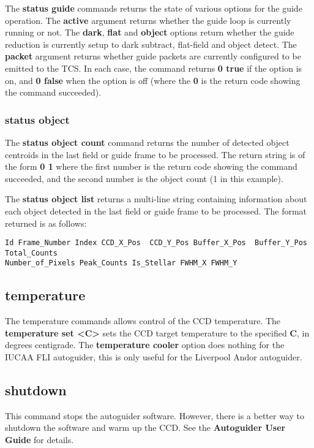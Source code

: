 \documentclass[10pt,a4paper]{article}
\begin{document}
The {\bf status guide} commands returns the state of various options for the guide operation. The {\bf active} argument returns whether the guide loop is currently running or not. The {\bf dark}, {\bf flat} and {\bf object} options return whether the guide reduction is currently setup to dark subtract, flat-field and object detect. The {\bf packet} argument returns whether guide packets are currently configured to be emitted to the TCS. In each case, the command returns {\bf 0 true} if the option is on, and {\bf 0 false} when the option is off (where the {\bf 0} is the return code showing the command succeeded).

\subsubsection{status object}

The {\bf status object count} command returns the number of detected object centroids in the last field or guide frame to be processed. The return string is of the form {\bf 0 1} where the first number is the return code showing the command succeeded, and the second number is the object count (1 in this example).

The {\bf status object list} returns a multi-line string containing information about each object detected in the last field or guide frame to be processed. The format returned is as follows:
\begin{verbatim}
Id Frame_Number Index CCD_X_Pos  CCD_Y_Pos Buffer_X_Pos  Buffer_Y_Pos  Total_Counts 
Number_of_Pixels Peak_Counts Is_Stellar FWHM_X FWHM_Y
\end{verbatim}

\subsection{temperature}

The temperature commands allows control of the CCD temperature. The {\bf temperature set \textless C\textgreater} sets
the CCD target temperature to the specified {\bf C}, in degrees centigrade. The {\bf temperature cooler} option does nothing for the IUCAA FLI autoguider, this is only useful for the Liverpool Andor autoguider.

\subsection{shutdown}

This command stops the autoguider software. However, there is a better way to shutdown the software and warm up the CCD. See the {\bf Autoguider User Guide} \cite{bib:autoguideruserguide} for details.
\end{document}
